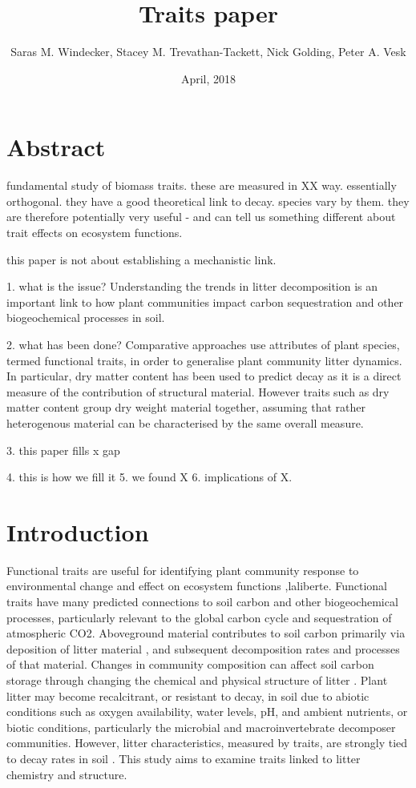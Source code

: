 \documentclass{article}
\begin{document}
\title{Traits paper}
\author{Saras M. Windecker, Stacey M. Trevathan-Tackett, Nick Golding, Peter A. Vesk}
\date{April, 2018}

\pgfplotsset{compat=1.9}

\section{Abstract}
fundamental study of biomass traits. these are measured in XX way. essentially orthogonal. they have a good theoretical link to decay. species vary by them. they are therefore potentially very useful - and can tell us something different about trait effects on ecosystem functions. 

this paper is not about establishing a mechanistic link. 


1. what is the issue?
Understanding the trends in litter decomposition is an important link to how plant communities impact carbon sequestration and other biogeochemical processes in soil. 

2. what has been done?
Comparative approaches use attributes of plant species, termed functional traits, in order to generalise plant community litter dynamics. In particular, dry matter content has been used to predict decay as it is a direct measure of the contribution of structural material. However traits such as dry matter content group dry weight material together, assuming that rather heterogenous material can be characterised by the same overall measure. 

3. this paper fills x gap


4. this is how we fill it
5. we found X
6. implications of X. 

\section{Introduction}

Functional traits are useful for identifying plant community response to environmental change and effect on ecosystem functions \citep{diaz2007,lavorel2002},laliberte. Functional traits have many predicted connections to soil carbon and other biogeochemical processes, particularly relevant to the global carbon cycle and sequestration of atmospheric CO2. Aboveground material contributes to soil carbon primarily via deposition of litter material \citep{valery2004}, and subsequent decomposition rates and processes of that material. Changes in community composition can affect soil carbon storage through changing the chemical and physical structure of litter \citep{liao2007}. Plant litter may become recalcitrant, or resistant to decay, in soil due to abiotic conditions such as oxygen availability, water levels, pH, and ambient nutrients, or biotic conditions, particularly the microbial and macroinvertebrate decomposer communities. However, litter characteristics, measured by traits, are strongly tied to decay rates in soil \citep{cornwell2008}. This study aims to examine traits linked to litter chemistry and structure. 
\end{document}
